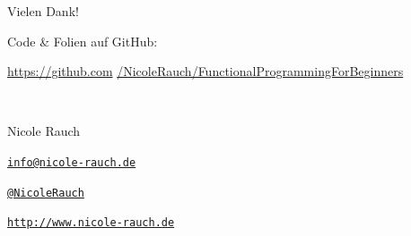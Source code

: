 {
\begin{frame}{Vielen Dank!}

        Code \& Folien auf GitHub:
        \begin{center}
                \url{https://github.com} \url{/NicoleRauch/FunctionalProgrammingForBeginners}
        \end{center}

        ~\\[1em]
        \begin{block}{Nicole Rauch}
        \begin{description}[Twitterxx]
                \item[E-Mail]  \href{mailto:info@nicole-rauch.de}{\texttt{info@nicole-rauch.de}}
                \item[Twitter] \href{http://twitter.com/NicoleRauch}{\texttt{@NicoleRauch}}
                \item[Web] \href{http://www.nicole-rauch.de}{\texttt{http://www.nicole-rauch.de}}
        \end{description}
        \end{block}
\end{frame}
}
